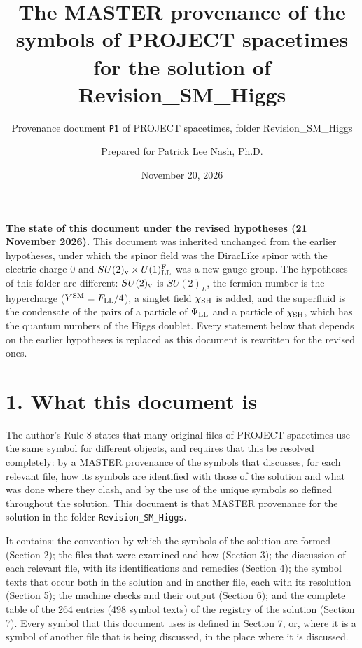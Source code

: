 \documentclass[
  10pt,
]{article}
\title{The MASTER provenance of the symbols of PROJECT spacetimes for
the solution of Revision\_SM\_Higgs}
\subtitle{Provenance document \texttt{P1} of PROJECT spacetimes, folder
Revision\_SM\_Higgs}
\author{Prepared for Patrick Lee Nash, Ph.D.}
\date{November 20, 2026}
\begin{document}
\maketitle

\textbf{The state of this document under the revised hypotheses (21
November 2026).} This document was inherited unchanged from the earlier
hypotheses, under which the spinor field was the DiracLike spinor with
the electric charge 0 and \(SU(2)_{\rm v}\times U(1)^{\rm F}_{\rm LL}\)
was a new gauge group. The hypotheses of this folder are different:
\(SU(2)_{\rm v}\) is \(SU(2)_L\), the fermion number is the hypercharge
(\(Y^{\rm SM}=F_{\rm LL}/4\)), a singlet field \(\chi_{\rm SH}\) is
added, and the superfluid is the condensate of the pairs of a particle
of \(\Psi_{\rm LL}\) and a particle of \(\chi_{\rm SH}\), which has the
quantum numbers of the Higgs doublet. Every statement below that depends
on the earlier hypotheses is replaced as this document is rewritten for
the revised ones.

\hypertarget{what-this-document-is}{%
\section{1. What this document is}\label{what-this-document-is}}

The author's Rule 8 states that many original files of PROJECT
spacetimes use the same symbol for different objects, and requires that
this be resolved completely: by a MASTER provenance of the symbols that
discusses, for each relevant file, how its symbols are identified with
those of the solution and what was done where they clash, and by the use
of the unique symbols so defined throughout the solution. This document
is that MASTER provenance for the solution in the folder
\texttt{Revision\_SM\_Higgs}.

It contains: the convention by which the symbols of the solution are
formed (Section 2); the files that were examined and how (Section 3);
the discussion of each relevant file, with its identifications and
remedies (Section 4); the symbol texts that occur both in the solution
and in another file, each with its resolution (Section 5); the machine
checks and their output (Section 6); and the complete table of the 264
entries (498 symbol texts) of the registry of the solution (Section 7).
Every symbol that this document uses is defined in Section 7, or, where
it is a symbol of another file that is being discussed, in the place
where it is discussed.
\end{document}
